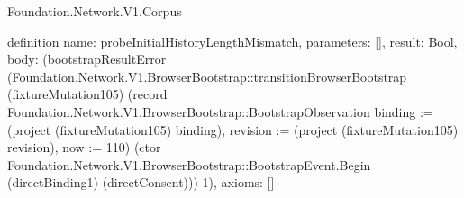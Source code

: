 \begin{lexlean}{Foundation.Network.V1.Corpus}
\begin{semanticmodule}
definition{
  name: probeInitialHistoryLengthMismatch,
  parameters: [],
  result: Bool,
  body: (bootstrapResultError (Foundation.Network.V1.BrowserBootstrap::transitionBrowserBootstrap (fixtureMutation105) (record Foundation.Network.V1.BrowserBootstrap::BootstrapObservation {binding := (project (fixtureMutation105) binding), revision := (project (fixtureMutation105) revision), now := 110}) (ctor Foundation.Network.V1.BrowserBootstrap::BootstrapEvent.Begin (directBinding1) (directConsent))) 1),
  axioms: []
}
\end{semanticmodule}
\end{lexlean}
